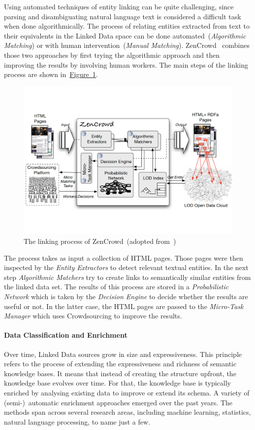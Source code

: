 Using automated techniques of entity linking can be quite challenging, since parsing and disambiguating natural language
text is considered a difficult task when done algorithmically. The process of relating entities extracted from text to their equivalents in the Linked Data space can be done automated~(\emph{Algorithmic Matching}) or with human intervention~(\emph{Manual Matching}). ZenCrowd~\cite{demartini2012} combines those two approaches by first trying the algorithmic approach and then improving the results by involving human workers. The main steps of the linking process are shown in~\hyperref[fig:zencrowd]{Figure~\ref*{fig:zencrowd}}.
\begin{figure}
	 \centering
	 \includegraphics[width=\textwidth]{graphics/zencrowd}
	 \caption{The linking process of ZenCrowd~(adopted from~\cite{demartini2012})}
	 \label{fig:zencrowd}
\end{figure}
The process takes as input a collection of HTML pages. Those pages were then inspected by the \emph{Entity Extractors} to detect relevant textual entities. In the next step \emph{Algorithmic Matchers} try to create links to semantically similar entities from the linked data set. The results of this process are stored in a \emph{Probabilistic Network} which is taken by the \emph{Decision Engine} to decide whether the results are useful or not. In the latter case, the HTML pages are passed to the \emph{Micro-Task Manager} which uses Crowdsourcing to improve the results. 


\paragraph{Data Classification and Enrichment}
Over time, Linked Data sources grow in size and expressiveness. This principle refers to the process of extending the expressiveness and richness 
of semantic knowledge bases. It means that instead of creating the structure upfront, the knowledge base evolves over time. For that, the knowledge 
base is typically enriched by analysing existing data to improve or extend its schema. A variety of (semi-)~automatic enrichment approaches emerged over the past years. The methods span across several research areas, including machine learning, statistics, natural language processing, to name just a few. 

